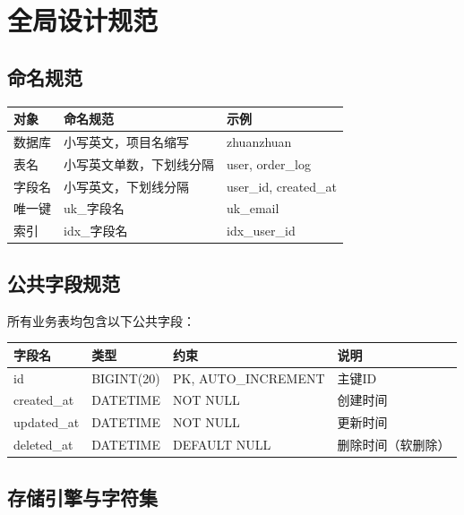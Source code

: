 \documentclass[12pt,a4paper,UTF8]{ctexart}
\begin{document}
\section{全局设计规范}

\subsection{命名规范}

\begin{longtable}{p{}|p{}|p{}}
    \toprule
    \textbf{对象} & \textbf{命名规范} & \textbf{示例} \\
    \midrule
    \endhead
    \bottomrule
    \endfoot

    数据库 & 小写英文，项目名缩写 & zhuanzhuan \\
    表名 & 小写英文单数，下划线分隔 & user, order\_log \\
    字段名 & 小写英文，下划线分隔 & user\_id, created\_at \\
    唯一键 & uk\_字段名 & uk\_email \\
    索引 & idx\_字段名 & idx\_user\_id \\
\end{longtable}

\subsection{公共字段规范}

所有业务表均包含以下公共字段：

\begin{longtable}{p{}|p{}|p{}|p{}}
    \toprule
    \textbf{字段名} & \textbf{类型} & \textbf{约束} & \textbf{说明} \\
    \midrule
    \endhead
    \bottomrule
    \endfoot

    id & BIGINT(20) & PK, AUTO\_INCREMENT & 主键ID \\
    created\_at & DATETIME & NOT NULL & 创建时间 \\
    updated\_at & DATETIME & NOT NULL & 更新时间 \\
    deleted\_at & DATETIME & DEFAULT NULL & 删除时间（软删除） \\
\end{longtable}

\subsection{存储引擎与字符集}
\end{document}

